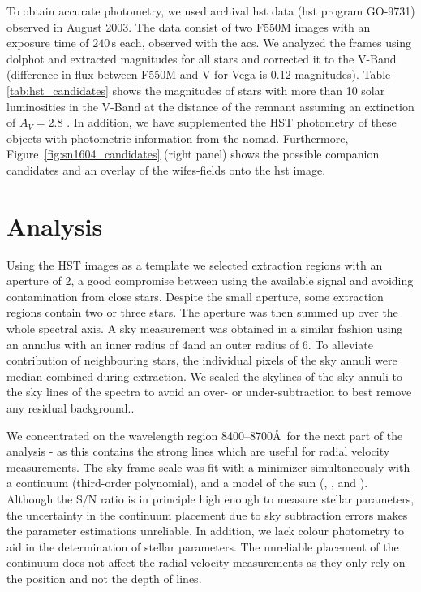 \documentclass[preprint2]{aastex}
\begin{document}
To obtain accurate photometry, we used archival \gls{hst} data (\gls{hst} program GO-9731) observed in August 2003. The data consist of two F550M images with an exposure time of $240\,\textrm{s}$ each, observed with the \gls{acs}. We analyzed the frames using \gls{dolphot} and extracted magnitudes for all stars and corrected it to the V-Band (difference in flux between F550M and V for Vega is 0.12 magnitudes). Table \ref{tab:hst_candidates} shows the magnitudes of stars with more than 10 solar luminosities in the V-Band at the distance of the remnant assuming an extinction of $A_V = 2.8$ \citep{2007ApJ...668L.135R}. In addition, we have supplemented the HST photometry of these objects with photometric information from the \gls{nomad}. Furthermore, Figure~\ref{fig:sn1604_candidates}  (right panel) shows the possible companion candidates and an overlay of the \gls{wifes}-fields onto the \gls{hst} image. 







\section{Analysis}
\label{sec:analysis}
 

Using the HST images as a template we selected extraction regions with an aperture of 2\arcsec, a good compromise between using the available signal and avoiding contamination from close stars. Despite the small aperture, some extraction regions contain two or three stars. The aperture was then summed up over the whole spectral axis. A sky measurement was obtained in a similar fashion using an annulus with an inner radius of 4\arcsec and an outer radius of 6\arcsec. To alleviate contribution of neighbouring stars,  the individual pixels of the sky annuli were median combined during extraction. We scaled the skylines of the sky annuli to the sky lines of the spectra to avoid an over- or under-subtraction to best remove any residual background..

We concentrated on the wavelength region 8400--8700\AA\ for the next part of the analysis - as this contains the strong  lines which are useful for radial velocity measurements. The sky-frame scale was fit with a minimizer \citep{powell1964efficient} simultaneously with a continuum (third-order polynomial), and a model of the sun (, , and ). Although the S/N ratio is in principle high enough to measure stellar parameters, the uncertainty in the continuum placement due to sky
subtraction errors makes the parameter estimations unreliable. In addition, we lack colour photometry to aid in the determination of stellar parameters. The unreliable placement of the continuum does not affect the radial velocity measurements as they only rely on the position and not the depth of lines.
\end{document}
